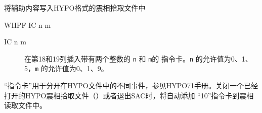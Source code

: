 \label{cmd:whpf}

将辅助内容写入HYPO格式的震相拾取文件中

\begin{SACSTX}
WHPF IC n m
\end{SACSTX}

\begin{description}
\item [IC n m]  在第18和19列插入带有两个整数的 \texttt{n} 和 \texttt{m}的
    指令卡。\texttt{n} 的允许值为0、1、5，\texttt{m} 的允许值为0、1、9。
\end{description}

``指令卡''用于分开在HYPO文件中的不同事件，参见HYPO71手册。关闭一个已经
打开的HYPO震相拾取文件（）或者退出SAC时，将自动添加
``10''指令卡到震相读取文件中。
